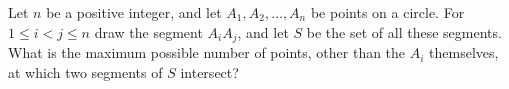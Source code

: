 Let $n$ be a positive integer, and let $A_1,A_2,\dots,A_n$ be points on a circle. For $1\le i<j\le n$ draw the segment $A_iA_j$, and let $S$ be the set of all these segments. What is the maximum possible number of points, other than the $A_i$ themselves, at which two segments of $S$ intersect?
